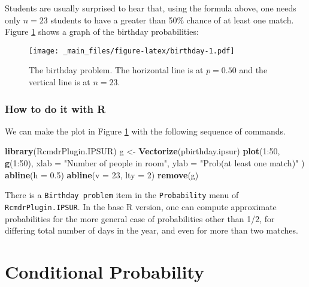 \documentclass[]{book}
\newenvironment{Shaded}{\begin{snugshade}}{\end{snugshade}}
\newcommand{\KeywordTok}[1]{\textcolor[rgb]{0.13,0.29,0.53}{\textbf{{#1}}}}
\newcommand{\DataTypeTok}[1]{\textcolor[rgb]{0.13,0.29,0.53}{{#1}}}
\newcommand{\DecValTok}[1]{\textcolor[rgb]{0.00,0.00,0.81}{{#1}}}
\newcommand{\FloatTok}[1]{\textcolor[rgb]{0.00,0.00,0.81}{{#1}}}
\newcommand{\StringTok}[1]{\textcolor[rgb]{0.31,0.60,0.02}{{#1}}}
\newcommand{\NormalTok}[1]{{#1}}
\numberwithin{equation}{chapter}
\numberwithin{figure}{chapter}
\theoremstyle{plain}
\theoremstyle{definition}
\theoremstyle{remark}
\theoremstyle{definition}
\theoremstyle{definition}
\theoremstyle{remark}
\begin{document}
Students are usually surprised to hear that, using the formula above,
one needs only \(n=23\) students to have a greater than 50\% chance of
at least one match. Figure \ref{fig:birthday} shows a graph of the
birthday probabilities:

\begin{figure}[htbp]
\centering
\texttt{[image: \_main\_files/figure-latex/birthday-1.pdf]}
\caption{\label{fig:birthday}\small The birthday problem. The horizontal line is
at \(p=0.50\) and the vertical line is at \(n=23\).}
\end{figure}




\subsubsection{How to do it with R}\label{how-to-do-it-with-r-14}

We can make the plot in Figure \ref{fig:birthday} with the following
sequence of commands.

\begin{Shaded}
\begin{Highlighting}[]
\KeywordTok{library}\NormalTok{(RcmdrPlugin.IPSUR)}
\NormalTok{g <-}\StringTok{ }\KeywordTok{Vectorize}\NormalTok{(pbirthday.ipsur)}
\KeywordTok{plot}\NormalTok{(}\DecValTok{1}\NormalTok{:}\DecValTok{50}\NormalTok{, }\KeywordTok{g}\NormalTok{(}\DecValTok{1}\NormalTok{:}\DecValTok{50}\NormalTok{), }\DataTypeTok{xlab =} \StringTok{"Number of people in room"}\NormalTok{, }
  \DataTypeTok{ylab =} \StringTok{"Prob(at least one match)"} \NormalTok{)}
\KeywordTok{abline}\NormalTok{(}\DataTypeTok{h =} \FloatTok{0.5}\NormalTok{)}
\KeywordTok{abline}\NormalTok{(}\DataTypeTok{v =} \DecValTok{23}\NormalTok{, }\DataTypeTok{lty =} \DecValTok{2}\NormalTok{)}
\KeywordTok{remove}\NormalTok{(g)}
\end{Highlighting}
\end{Shaded}

There is a \texttt{Birthday\ problem} item in the \texttt{Probability}
menu \newline of \texttt{RcmdrPlugin.IPSUR}. In the base R version, one
can compute approximate probabilities for the more general case of
probabilities other than 1/2, for differing total number of days in the
year, and even for more than two matches.

\section{Conditional Probability}\label{sec-conditional-probability}
\end{document}
